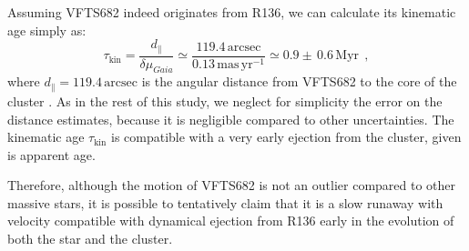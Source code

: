 \documentclass[apjl,twocolumn]{emulateapj}
\newcommand{\kms}{{\,\mathrm{km\ s^{-1}}}}
\newcommand{\masyr}{\,\mathrm{mas}\,\mathrm{yr}^{-1}}
\begin{document}
Assuming VFTS682 indeed originates from R136, we can calculate its kinematic
age simply as:
\begin{equation}
  \label{eq:kin_age}
  \tau_\mathrm{kin} = \frac{d_\parallel}{\delta\mu_{Gaia}} \simeq
  \frac{119.4\,\mathrm{arcsec}}{0.13\masyr} \simeq 0.9\pm\,0.6\, \mathrm{Myr} \ \ ,
\end{equation}
where $d_\parallel = 119.4\,\mathrm{arcsec}$ is the angular distance from VFTS682 to
the core of the cluster \citep[corresponding to $\sim$29\,pc at LMC distance,][]{bestenlehner:11}.
As in the rest of this study, we neglect for
simplicity the error on the distance estimates, because it is negligible compared to other uncertainties.
The kinematic age $\tau_\mathrm{kin}$ is compatible with a very early
ejection from the cluster, given is apparent age.

Therefore, although the motion of VFTS682 is not an outlier compared
to other massive stars, it is possible to tentatively claim that it is
a slow runaway with velocity compatible with dynamical ejection from
R136 early in the evolution of both the star and the cluster. 




\end{document}

